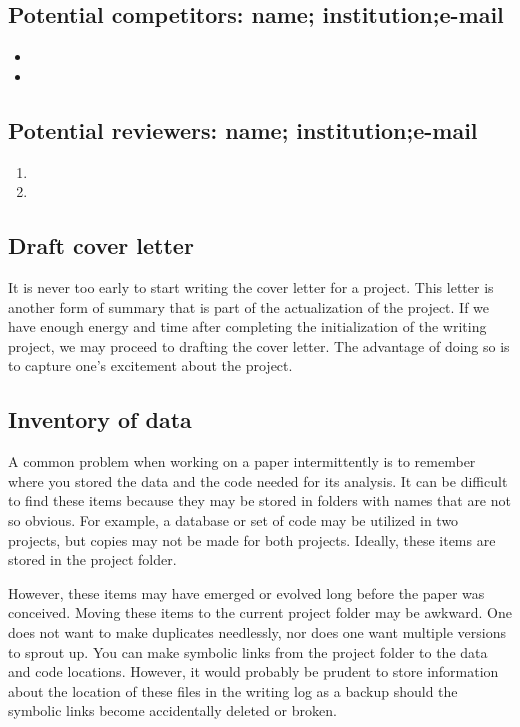 \documentclass[10pt,letterpaper]{article}
\newcommand{\bi}{\begin{itemize}}
\newcommand{\ei}{\end{itemize}}
\newcommand{\be}{\begin{enumerate}}
\newcommand{\ee}{\end{enumerate}}
\begin{document}
\subsection{Potential competitors: name; institution;e-mail}
\label{sub:competitors}

\bi
\item
\item 
\ei



\subsection{Potential reviewers: name; institution;e-mail}
\label{sub:reviewers}

\be
    \item 
    \item
\ee


\subsection{Draft cover letter}
\label{sub:coverletter}

It is never too early to start writing the cover letter for a project.
This letter is another form of summary that is part of the actualization of the project.
If we have enough energy and time after completing the initialization of the writing project, we may proceed to drafting the cover letter.
The advantage of doing so is to capture one's excitement about the project.

\subsection{Inventory of data}

A common problem when working on a paper intermittently is to remember where you stored the data and the code needed for its analysis.
It can be difficult to find these items because they may be stored in folders with names that are not so obvious.
For example, a database or set of code may be utilized in two projects, but copies may not be made for both projects.
Ideally, these items are stored in the project folder.

However, these items may have emerged or evolved long before the paper was conceived. 
Moving these items to the current project folder may be awkward.
One does not want to make duplicates needlessly, nor does one want multiple versions to sprout up.
You can make symbolic links from the project folder to the data and code locations. 
However, it would probably be prudent to store information about the location of these files in the writing log as a backup should the symbolic links become accidentally deleted or broken.
\end{document}
